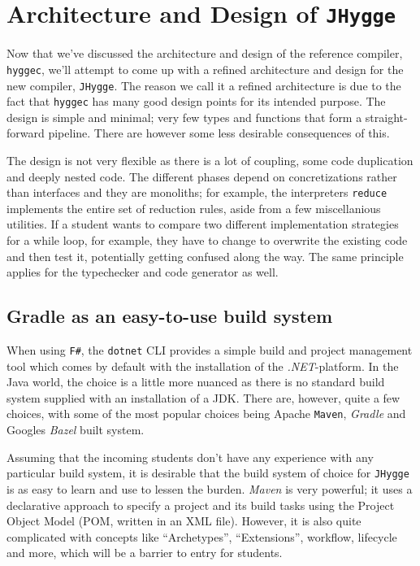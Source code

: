 \section{Architecture and Design of \texttt{JHygge}}

Now that we've discussed the architecture and design of the reference compiler, \texttt{hyggec}, we'll attempt to come up with
a refined architecture and design for the new compiler, \texttt{JHygge}. The reason we call it a refined architecture is due to
the fact that \texttt{hyggec} has many good design points for its intended purpose. The design is simple and minimal; very
few types and functions that form a straight-forward pipeline. There are however some less desirable consequences of this.

The design is not very flexible as there is a lot of coupling, some code duplication and deeply nested code. The different
phases depend on concretizations rather than interfaces and they are monoliths; for example, the interpreters \texttt{reduce}
implements the entire set of reduction rules, aside from a few miscellanious utilities. If a student wants to compare two different
implementation strategies for a while loop, for example, they have to change to overwrite the existing code and then test it,
potentially getting confused along the way. The same principle applies for the typechecker and code generator as well.

\subsection{Gradle as an easy-to-use build system}

When using \texttt{F\#}, the \texttt{dotnet} CLI provides a simple build and project management tool which comes by default
with the installation of the \textit{.NET}-platform. In the Java world, the choice is a little more nuanced as there is
no standard build system supplied with an installation of a JDK. There are, however, quite a few choices, with some of the
most popular choices being Apache \texttt{Maven}, \textit{Gradle} and Googles \textit{Bazel} built system.

Assuming that the incoming students don't have any experience with any particular build system, it is desirable that the
build system of choice for \texttt{JHygge} is as easy to learn and use to lessen the burden. \textit{Maven} is very
powerful; it uses a declarative approach to specify a project and its build tasks using the Project Object Model (POM,
written in an XML file).
However, it is also quite complicated with concepts like ``Archetypes'', ``Extensions'', workflow, lifecycle and more,
which will be a barrier to entry for students.

